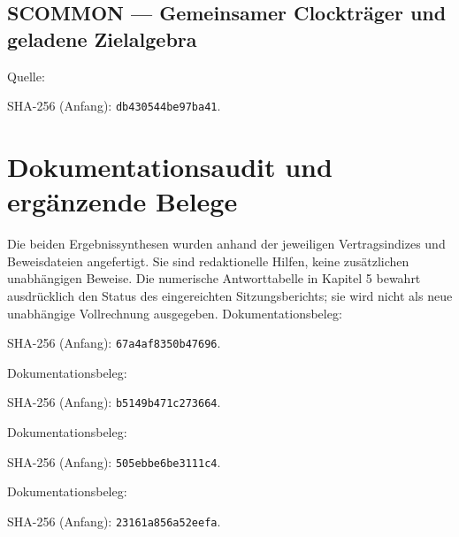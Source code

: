 \documentclass[11pt,a4paper,oneside,parskip=half,headings=normal,numbers=noenddot,bibliography=totoc]{scrreprt}
\begin{document}
\subsection*{SCOMMON — Gemeinsamer Clockträger und geladene Zielalgebra}\label{s:COMMON}
Quelle: \par{\footnotesize SHA-256 (Anfang): \texttt{db430544be97ba41}.}\par
\section{Dokumentationsaudit und ergänzende Belege}
Die beiden Ergebnissynthesen wurden anhand der jeweiligen Vertragsindizes und Beweisdateien angefertigt. Sie sind redaktionelle Hilfen, keine zusätzlichen unabhängigen Beweise. Die numerische Antworttabelle in Kapitel 5 bewahrt ausdrücklich den Status des eingereichten Sitzungsberichts; sie wird nicht als neue unabhängige Vollrechnung ausgegeben.
Dokumentationsbeleg: \par{\footnotesize SHA-256 (Anfang): \texttt{67a4af8350b47696}.}\par
Dokumentationsbeleg: \par{\footnotesize SHA-256 (Anfang): \texttt{b5149b471c273664}.}\par
Dokumentationsbeleg: \par{\footnotesize SHA-256 (Anfang): \texttt{505ebbe6be3111c4}.}\par
Dokumentationsbeleg: \par{\footnotesize SHA-256 (Anfang): \texttt{23161a856a52eefa}.}\par

\renewcommand{\bibname}{Wissenschaftlicher Methodenrahmen}
\end{document}

